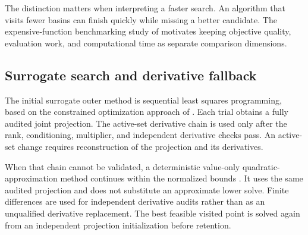 The distinction matters when interpreting a faster search. An algorithm that visits fewer basins can finish quickly while missing a better candidate. The expensive-function benchmarking study of \citet{Bliek2023} motivates keeping objective quality, evaluation work, and computational time as separate comparison dimensions.

\subsection{Surrogate search and derivative fallback}

The initial surrogate outer method is sequential least squares programming, based on the constrained optimization approach of \citet{Kraft1988}. Each trial obtains a fully audited joint projection. The active-set derivative chain is used only after the rank, conditioning, multiplier, and independent derivative checks pass. An active-set change requires reconstruction of the projection and its derivatives.

When that chain cannot be validated, a deterministic value-only quadratic-approximation method continues within the normalized bounds \citep{Ragonneau2022}. It uses the same audited projection and does not substitute an approximate lower solve. Finite differences are used for independent derivative audits rather than as an unqualified derivative replacement. The best feasible visited point is solved again from an independent projection initialization before retention.

